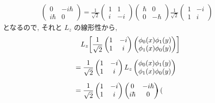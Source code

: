 \documentclass[../../ou-physics-exam.tex]{subfiles}
\begin{document}
\begin{answer}
\begin{align*}
\begin{pmatrix}
            0 & -i \hbar \\
            i \hbar & 0
        \end{pmatrix}
        = \frac{1}{\sqrt{2}}
        \begin{pmatrix}
            1 & 1 \\
            i & -i
        \end{pmatrix}
        \begin{pmatrix}
            \hbar & 0 \\
            0 & - \hbar
        \end{pmatrix}
        \frac{1}{\sqrt{2}} 
        \begin{pmatrix}
            1 & -i \\
            1 & i
        \end{pmatrix}
    \end{align*}
    となるので, それと $ L_z $ の線形性から,
    \begin{align*}
        & \quad L_z \qty[ \frac{1}{\sqrt{2}} 
        \begin{pmatrix}
            1 & -i \\
            1 & i
        \end{pmatrix}
        \begin{pmatrix}
            \phi_0 (x) \phi_1 (y) \\
            \phi_1 (x) \phi_0 (y)
        \end{pmatrix}
        ] \\[2mm]
        & = \frac{1}{\sqrt{2}} 
        \begin{pmatrix}
            1 & -i \\
            1 & i
        \end{pmatrix}
        L_z 
        \begin{pmatrix}
            \phi_0 (x) \phi_1 (y) \\
            \phi_1 (x) \phi_0 (y)
        \end{pmatrix} \\[2mm]
        & = \frac{1}{\sqrt{2}} 
        \begin{pmatrix}
            1 & -i \\
            1 & i
        \end{pmatrix}
        \begin{pmatrix}
            0 & -i \hbar \\
            i \hbar & 0
        \end{pmatrix}
        \begin{pmatrix}

\end{pmatrix}
\end{align*}
\end{answer}
\end{document}
